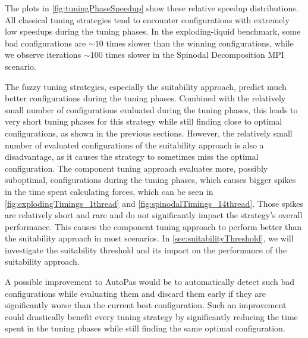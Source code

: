 The plots in \autoref{fig:tuningPhaseSpeedup} show these relative speedup distributions. All classical tuning strategies tend to encounter configurations with extremely low speedups during the tuning phases. In the exploding-liquid benchmark, some bad configurations are $\sim10$ times slower than the winning configurations, while we observe iterations $\sim100$ times slower in the Spinodal Decomposition MPI scenario.

The fuzzy tuning strategies, especially the suitability approach, predict much better configurations during the tuning phases. Combined with the relatively small number of configurations evaluated during the tuning phases, this leads to very short tuning phases for this strategy while still finding close to optimal configurations, as shown in the previous sections. However, the relatively small number of evaluated configurations of the suitability approach is also a disadvantage, as it causes the strategy to sometimes miss the optimal configuration.
The component tuning approach evaluates more, possibly suboptimal, configurations during the tuning phases, which causes bigger spikes in the time spent calculating forces, which can be seen in \autoref{fig:explodingTimings_1thread} and \autoref{fig:spinodalTimings_14thread}. Those spikes are relatively short and rare and do not significantly impact the strategy's overall performance. This causes the component tuning approach to perform better than the suitability approach in most scenarios.
In \autoref{sec:suitabilityThreshold}, we will investigate the suitability threshold and its impact on the performance of the suitability approach.

\smallskip

A possible improvement to AutoPas would be to automatically detect such bad configurations while evaluating them and discard them early if they are significantly worse than the current best configuration. Such an improvement could drastically benefit every tuning strategy by significantly reducing the time spent in the tuning phases while still finding the same optimal configuration.


\newpage

